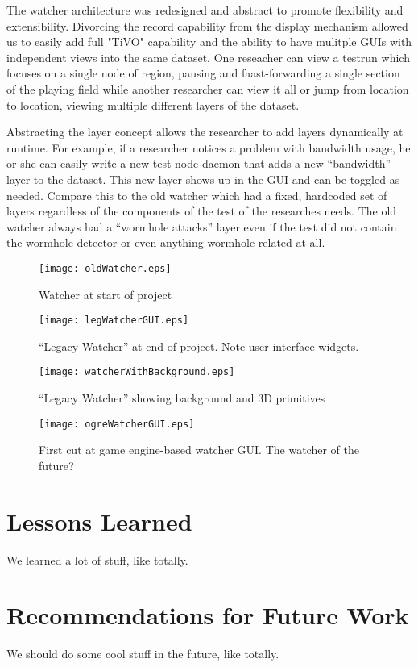 \documentclass{report}
\begin{document}
The watcher architecture was redesigned and abstract to promote flexibility and extensibility. Divorcing the record 
capability from the display mechanism allowed us to easily add full "TiVO" capability and the ability to have mulitple 
GUIs with independent views into the same dataset. One reseacher can view a testrun which focuses on a single node of region, 
pausing and faast-forwarding a single section of the playing field while another researcher can view it all or jump from 
location to location, viewing multiple different layers of the dataset. 

Abstracting the layer concept allows the researcher to add layers dynamically at runtime. For example, 
         if a researcher notices a problem with bandwidth usage, he or she can easily write a new test node daemon that 
         adds a new ``bandwidth'' layer to the dataset. This new layer shows up in the GUI and can be toggled as needed. 
         Compare this to the old watcher which had a fixed, hardcoded set of layers regardless of the components of the test
         of the researches needs. The old watcher always had a ``wormhole attacks'' layer even if the test did not 
         contain the wormhole detector or even anything wormhole related at all. 


\begin{figure}
\label{fig:oldWatcher}
\texttt{[image: oldWatcher.eps]}
\caption{Watcher at start of project}
\end{figure}

\begin{figure}
\label{fig:legWatcherGUI}
\texttt{[image: legWatcherGUI.eps]}
\caption{``Legacy Watcher'' at end of project. Note user interface widgets.}
\end{figure}

\begin{figure}
\label{fig:watcherWithBackground}
\texttt{[image: watcherWithBackground.eps]}
\caption{``Legacy Watcher'' showing background and 3D primitives}
\end{figure}

\begin{figure}
\label{fig:ogreWatcherGUI}
\texttt{[image: ogreWatcherGUI.eps]}
\caption{First cut at game engine-based watcher GUI. The watcher of the future?}
\end{figure}

\section{Lessons Learned}
We learned a lot of stuff, like totally.

\section{Recommendations for Future Work}
We should do some cool stuff in the future, like totally. 
\end{document}
